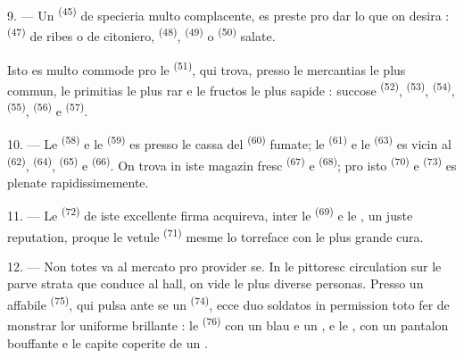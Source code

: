 9. --- Un  \textsuperscript{(45)} de specieria multo complacente,
es preste pro dar lo que on desira :  \textsuperscript{(47)} de
ribes o de citoniero,  \textsuperscript{(48)},
 \textsuperscript{(49)} o 
\textsuperscript{(50)} salate.

Isto es multo commode pro le  \textsuperscript{(51)}, qui trova,
presso le mercantias le plus commun, le primitias le plus rar e le fructos le
plus sapide : succose  \textsuperscript{(52)}, 
\textsuperscript{(53)},  \textsuperscript{(54)}, 
\textsuperscript{(55)},  \textsuperscript{(56)} e
 \textsuperscript{(57)}.

\VUsaut{4.0mm}
\VUsaut{3.0mm}

10. --- Le  \textsuperscript{(58)} e le 
\textsuperscript{(59)} es presso le cassa del 
\textsuperscript{(60)} fumate; le  \textsuperscript{(61)} e le
 \textsuperscript{(63)} es vicin al 
\textsuperscript{(62)},  \textsuperscript{(64)},  \textsuperscript{(65)} e  \textsuperscript{(66)}. On trova
in iste magazin fresc  \textsuperscript{(67)} e 
\textsuperscript{(68)}; pro isto  \textsuperscript{(70)} e
 \textsuperscript{(73)} es plenate rapidissimemente.

11. --- Le  \textsuperscript{(72)} de iste excellente firma
acquireva, inter le  \textsuperscript{(69)} e le
, un juste reputation, proque le vetule 
\textsuperscript{(71)} mesme lo torreface con le plus grande cura.

\VUsaut{4.0mm}
\VUsaut{3.0mm}

12. --- Non totes va al mercato pro provider se. In le pittoresc circulation sur
le parve strata que conduce al hall, on vide le plus diverse personas. Presso un
affabile  \textsuperscript{(75)}, qui pulsa ante
se un  \textsuperscript{(74)}, ecce duo soldatos in
permission toto fer de monstrar lor uniforme brillante : le 
\textsuperscript{(76)} con un blau  e un , e le , con un pantalon bouffante e le capite
coperite de un .

